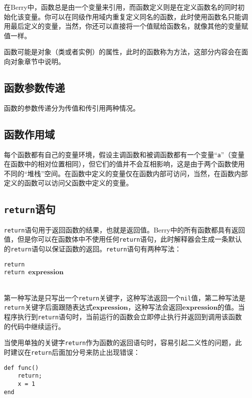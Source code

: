 在Berry中，函数总是由一个变量来引用，而函数定义则是在定义函数名的同时初始化该变量。你可以在同级作用域内重复定义同名的函数，此时使用函数名只能调用最后定义的变量，当然，你还可以直接将一个值赋给函数名，就像其他的变量赋值一样。

函数可能是对象（类或者实例）的属性，此时的函数称为方法，这部分内容会在面向对象章节中说明。

\subsection{函数参数传递}

函数的参数传递分为传值和传引用两种情况。


\subsection{函数作用域}

每个函数都有自己的变量环境，假设主调函数和被调函数都有一个变量``\texttt{a}''（变量在函数中的相对位置相同），但它们的值并不会互相影响，这是由于两个函数使用不同的``堆栈''空间。在函数中定义的变量仅在函数内部可访问，当然，在函数内部定义的函数可以访问父函数中定义的变量。

\subsection{\texttt{return}语句}

\texttt{return}语句用于返回函数的结果，也就是返回值。Berry中的所有函数都具有返回值，但是你可以在函数体中不使用任何\texttt{return}语句，此时解释器会生成一条默认的\texttt{return}语句以保证函数的返回。\texttt{return}语句有两种写法：
\begin{algorithm}
    \texttt{return} \\
    \texttt{return }$\bm{expression}$
\end{algorithm}\vspace{-0.6em}\\
第一种写法是只写出一个\texttt{return}关键字，这种写法返回一个\texttt{nil}值，第二种写法是\texttt{return}关键字后面跟随表达式$\bm{expression}$，这种写法会返回$\bm{expression}$的值。当程序执行到\texttt{return}语句时，当前运行的函数会立即停止执行并返回到调用该函数的代码中继续运行。

当使用单独的关键字\texttt{return}作为函数的返回语句时，容易引起二义性的问题，此时建议在\texttt{return}后面加分号来防止出现错误：
\begin{lstlisting}[language=berry, numbers=none]
def func()
    return;
    x = 1
end
\end{lstlisting}

